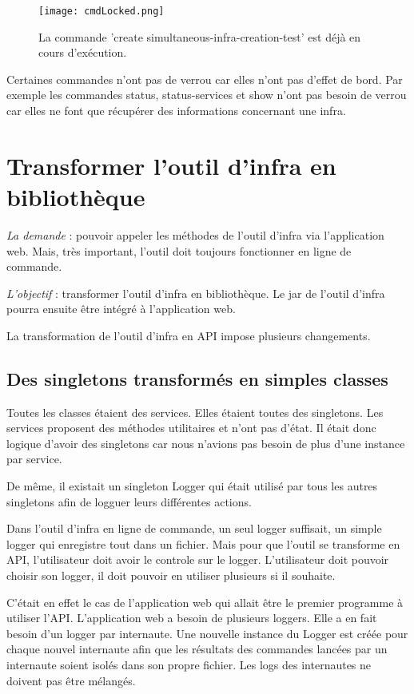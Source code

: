 \begin{figure}[H]
  \texttt{[image: cmdLocked.png]}
  \caption{La commande 'create simultaneous-infra-creation-test' est déjà en
    cours d'exécution.}
\end{figure}

Certaines commandes n'ont pas de verrou car elles n'ont pas d'effet de bord.
Par exemple les commandes status, status-services et show n'ont pas besoin
de verrou car elles ne font que récupérer des informations concernant une infra.

\section{Transformer l'outil d'infra en bibliothèque}

\textit{La demande} : pouvoir appeler les méthodes de l'outil d'infra via l'application
web. Mais, très important, l'outil doit toujours fonctionner en ligne de
commande.

\textit{L'objectif} : transformer l'outil d'infra en bibliothèque.
Le jar de l'outil d'infra pourra ensuite être intégré à l'application web.

La transformation de l'outil d'infra en API impose plusieurs changements.

\subsection{Des singletons transformés en simples classes}

Toutes les classes étaient des services. Elles étaient toutes des singletons.
Les services proposent des méthodes utilitaires et n'ont pas d'état. Il était
donc logique d'avoir des singletons car nous n'avions pas besoin de plus d'une
instance par service. 

De même, il existait un singleton Logger qui était utilisé par tous les autres
singletons afin de logguer leurs différentes actions.

Dans l'outil d'infra en ligne de commande, un seul logger suffisait, un simple
logger qui enregistre tout dans un fichier.
Mais pour que l'outil se transforme en API, l'utilisateur doit avoir le
controle sur le logger. L'utilisateur doit pouvoir choisir son logger, il doit
pouvoir en utiliser plusieurs si il souhaite.

C'était en effet le cas de l'application web qui allait être le premier
programme à utiliser l'API. L'application web a besoin de plusieurs
loggers. Elle a en fait besoin d'un logger par internaute.
Une nouvelle instance du Logger est créée pour chaque nouvel internaute afin
que les résultats des commandes lancées par un internaute soient isolés dans son
propre fichier. Les logs des internautes ne doivent pas être mélangés.

